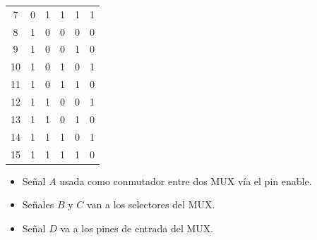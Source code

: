 \begin{center}
\begin{minipage}[t]{0.3\textwidth}
\begin{tabular}{cccccc}
\multicolumn{1}{c|}{7}                           & 0 & 1 & 1 & \multicolumn{1}{c|}{1}                         & 1                             \\
\multicolumn{1}{c|}{8}                           & 1 & 0 & 0 & \multicolumn{1}{c|}{0}                         & 0                             \\
\multicolumn{1}{c|}{9}                           & 1 & 0 & 0 & \multicolumn{1}{c|}{1}                         & 0                             \\
\multicolumn{1}{c|}{10}                          & 1 & 0 & 1 & \multicolumn{1}{c|}{0}                         & 1                             \\
\multicolumn{1}{c|}{11}                          & 1 & 0 & 1 & \multicolumn{1}{c|}{1}                         & 0                             \\
\multicolumn{1}{c|}{12}                          & 1 & 1 & 0 & \multicolumn{1}{c|}{0}                         & 1                             \\
\multicolumn{1}{c|}{13}                          & 1 & 1 & 0 & \multicolumn{1}{c|}{1}                         & 0                             \\
\multicolumn{1}{c|}{14}                          & 1 & 1 & 1 & \multicolumn{1}{c|}{0}                         & 1                             \\
\multicolumn{1}{c|}{15}                          & 1 & 1 & 1 & \multicolumn{1}{c|}{1}                         & 0                            
\end{tabular}
\end{minipage}
\begin{minipage}[t]{0.5\textwidth}
    \begin{itemize}[nosep]
        \item Señal $A$ usada como conmutador entre dos MUX vía el pin enable.
        \item Señales $B$ y $C$ van a los selectores del MUX.
        \item Señal $D$ va a los pines de entrada del MUX.
    \end{itemize}
\end{minipage}
\end{center}
